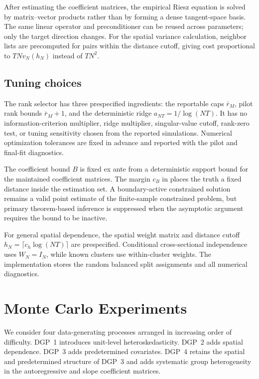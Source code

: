 \documentclass[11pt]{article}
\numberwithin{equation}{section}
\theoremstyle{remark}
\begin{document}
After estimating the coefficient matrices, the empirical Riesz equation is solved by matrix--vector products rather than by forming a dense tangent-space basis. The same linear operator and preconditioner can be reused across parameters; only the target direction changes. For the spatial variance calculation, neighbor lists are precomputed for pairs within the distance cutoff, giving cost proportional to $TNv_N(h_N)$ instead of $TN^2$.

\subsection{Tuning choices}
\label{subsec:tuning}

The rank selector has three prespecified ingredients: the reportable caps $\bar r_M$, pilot rank bounds $\bar r_M+1$, and the deterministic ridge $a_{NT}=1/\log(NT)$. It has no information-criterion multiplier, ridge multiplier, singular-value cutoff, rank-zero test, or tuning sensitivity chosen from the reported simulations. Numerical optimization tolerances are fixed in advance and reported with the pilot and final-fit diagnostics.

The coefficient bound $B$ is fixed ex ante from a deterministic support bound for the maintained coefficient matrices. The margin $c_B$ in  places the truth a fixed distance inside the estimation set. A boundary-active constrained solution remains a valid point estimate of the finite-sample constrained problem, but primary theorem-based inference is suppressed when the asymptotic argument requires the bound to be inactive.

For general spatial dependence, the spatial weight matrix and distance cutoff $h_N=\lceil c_h\log(NT)\rceil$ are prespecified. Conditional cross-sectional independence uses $W_N=I_N$, while known clusters use within-cluster weights. The implementation stores the random balanced split assignments and all numerical diagnostics.

\section{Monte Carlo Experiments}
\label{sec:MC}

We consider four data-generating processes arranged in increasing order of difficulty. DGP~1 introduces unit-level heteroskedasticity. DGP~2 adds spatial dependence. DGP~3 adds predetermined covariates. DGP~4 retains the spatial and predetermined structure of DGP~3 and adds systematic group heterogeneity in the autoregressive and slope coefficient matrices.
\end{document}
